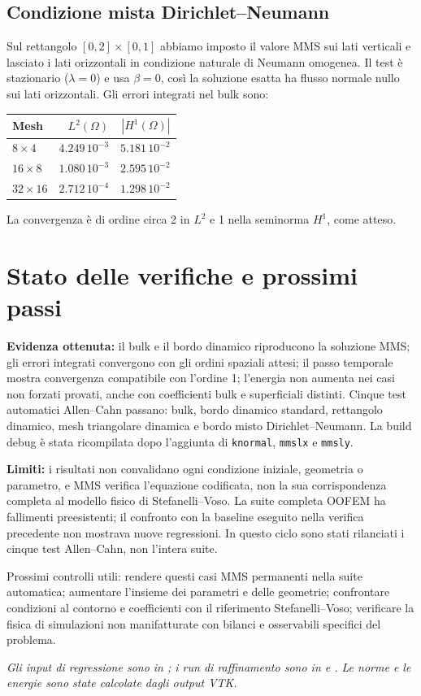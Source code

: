 \documentclass[11pt,a4paper]{article}
\begin{document}
\subsection*{Condizione mista Dirichlet--Neumann}
Sul rettangolo $[0,2]\times[0,1]$ abbiamo imposto il valore MMS sui lati verticali e lasciato i lati orizzontali in condizione naturale di Neumann omogenea. Il test è stazionario ($\lambda=0$) e usa $\beta=0$, così la soluzione esatta ha flusso normale nullo sui lati orizzontali. Gli errori integrati nel bulk sono:
\begin{center}\small
\begin{tabular}{lrr}
\toprule
Mesh & $L^2(\Omega)$ & $|H^1(\Omega)|$\\
\midrule
$8\times4$ & $4.249\,10^{-3}$ & $5.181\,10^{-2}$\\
$16\times8$ & $1.080\,10^{-3}$ & $2.595\,10^{-2}$\\
$32\times16$ & $2.712\,10^{-4}$ & $1.298\,10^{-2}$\\
\bottomrule
\end{tabular}
\end{center}
La convergenza è di ordine circa 2 in $L^2$ e 1 nella seminorma $H^1$, come atteso.

\clearpage
\section{Stato delle verifiche e prossimi passi}
\textbf{Evidenza ottenuta:} il bulk e il bordo dinamico riproducono la soluzione MMS; gli errori integrati convergono con gli ordini spaziali attesi; il passo temporale mostra convergenza compatibile con l'ordine 1; l'energia non aumenta nei casi non forzati provati, anche con coefficienti bulk e superficiali distinti. Cinque test automatici Allen--Cahn passano: bulk, bordo dinamico standard, rettangolo dinamico, mesh triangolare dinamica e bordo misto Dirichlet--Neumann. La build debug è stata ricompilata dopo l'aggiunta di \texttt{knormal}, \texttt{mmslx} e \texttt{mmsly}.

\textbf{Limiti:} i risultati non convalidano ogni condizione iniziale, geometria o parametro, e MMS verifica l'equazione codificata, non la sua corrispondenza completa al modello fisico di Stefanelli--Voso. La suite completa OOFEM ha fallimenti preesistenti; il confronto con la baseline eseguito nella verifica precedente non mostrava nuove regressioni. In questo ciclo sono stati rilanciati i cinque test Allen--Cahn, non l'intera suite.

Prossimi controlli utili: rendere questi casi MMS permanenti nella suite automatica; aumentare l'insieme dei parametri e delle geometrie; confrontare condizioni al contorno e coefficienti con il riferimento Stefanelli--Voso; verificare la fisica di simulazioni non manifatturate con bilanci e osservabili specifici del problema.

\vfill
\small\textit{Gli input di regressione sono in ; i run di raffinamento sono in  e . Le norme e le energie sono state calcolate dagli output VTK.}
\end{document}
